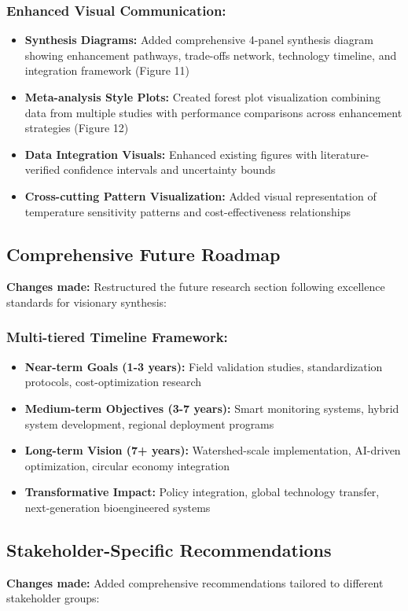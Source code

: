 \documentclass[12pt,a4paper]{article}
\begin{document}
\subsubsection{Enhanced Visual Communication:}
\begin{itemize}
\item \textbf{Synthesis Diagrams:} Added comprehensive 4-panel synthesis diagram showing enhancement pathways, trade-offs network, technology timeline, and integration framework (Figure 11)
\item \textbf{Meta-analysis Style Plots:} Created forest plot visualization combining data from multiple studies with performance comparisons across enhancement strategies (Figure 12)
\item \textbf{Data Integration Visuals:} Enhanced existing figures with literature-verified confidence intervals and uncertainty bounds
\item \textbf{Cross-cutting Pattern Visualization:} Added visual representation of temperature sensitivity patterns and cost-effectiveness relationships
\end{itemize}

\subsection{Comprehensive Future Roadmap}
\textbf{Changes made:} Restructured the future research section following excellence standards for visionary synthesis:

\subsubsection{Multi-tiered Timeline Framework:}
\begin{itemize}
\item \textbf{Near-term Goals (1-3 years):} Field validation studies, standardization protocols, cost-optimization research
\item \textbf{Medium-term Objectives (3-7 years):} Smart monitoring systems, hybrid system development, regional deployment programs
\item \textbf{Long-term Vision (7+ years):} Watershed-scale implementation, AI-driven optimization, circular economy integration
\item \textbf{Transformative Impact:} Policy integration, global technology transfer, next-generation bioengineered systems
\end{itemize}

\subsection{Stakeholder-Specific Recommendations}
\textbf{Changes made:} Added comprehensive recommendations tailored to different stakeholder groups:
\end{document}
